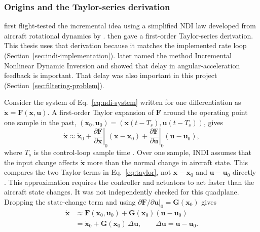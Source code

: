 \documentclass{article}
\begin{document}
\subsubsection{Origins and the Taylor-series derivation}
\citet{smithberry2000} first flight-tested the incremental idea using a simplified NDI law developed from aircraft rotational dynamics by \citet{smith1998}. \citet{bacon2000} then gave a first-order Taylor-series derivation. This thesis uses that derivation because it matches the implemented rate loop (Section~\ref{sec:indi-implementation}). \citet{sieberling2010} later named the method Incremental Nonlinear Dynamic Inversion and showed that delay in angular-acceleration feedback is important. That delay was also important in this project (Section~\ref{sec:filtering-problem}).

Consider the system of Eq.~\eqref{eq:ndi-system} written for one differentiation as $\dot{\mathbf{x}}=\mathbf{F}(\mathbf{x},\mathbf{u})$. A first-order Taylor expansion of $\mathbf{F}$ around the operating point one sample in the past, $(\mathbf{x}_0,\mathbf{u}_0)=(\mathbf{x}(t-T_s),\mathbf{u}(t-T_s))$, gives
\begin{equation}
    \dot{\mathbf{x}}\approx\dot{\mathbf{x}}_0
    +\left.\frac{\partial\mathbf{F}}{\partial\mathbf{x}}\right|_{0}\!\!(\mathbf{x}-\mathbf{x}_0)
    +\left.\frac{\partial\mathbf{F}}{\partial\mathbf{u}}\right|_{0}\!\!(\mathbf{u}-\mathbf{u}_0),
    \label{eq:taylor}
\end{equation}
where $T_s$ is the control-loop sample time \citep{bacon2000,steinertPart1_2025}. Over one sample, INDI assumes that the input change affects $\dot{\mathbf{x}}$ more than the normal change in aircraft state. This compares the two Taylor terms in Eq.~\eqref{eq:taylor}, not $\mathbf{x}-\mathbf{x}_0$ and $\mathbf{u}-\mathbf{u}_0$ directly \citep{lombaerts2019,steinertPart1_2025}. This approximation requires the controller and actuators to act faster than the aircraft state changes. It was not independently checked for this quadplane. Dropping the state-change term and using $\left.\partial\mathbf{F}/\partial\mathbf{u}\right|_0=\mathbf{G}(\mathbf{x}_0)$ gives
\begin{equation}
    \begin{aligned}
        \dot{\mathbf{x}} &\approx \mathbf{F}(\mathbf{x}_0,\mathbf{u}_0)+\mathbf{G}(\mathbf{x}_0)(\mathbf{u}-\mathbf{u}_0)\\
        &=\dot{\mathbf{x}}_0+\mathbf{G}(\mathbf{x}_0)\,\Delta\mathbf{u},\qquad \Delta\mathbf{u}=\mathbf{u}-\mathbf{u}_0.
    \end{aligned}
    \label{eq:indi-taylor-simplified}
\end{equation}
\end{document}
